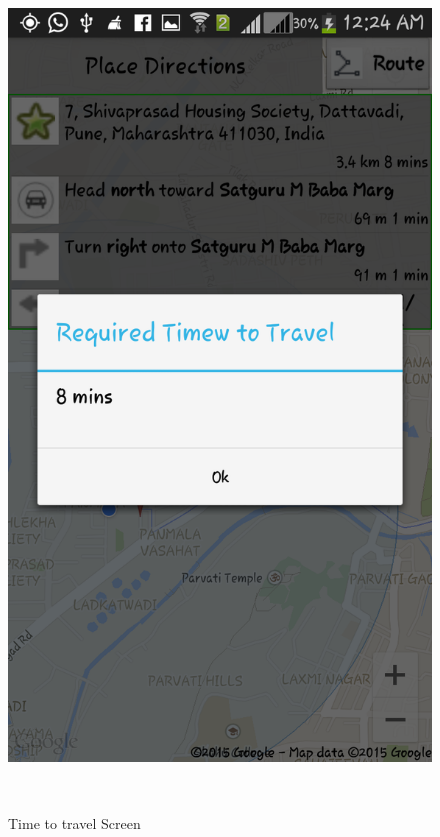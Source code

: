 \documentclass[12pt,a4paper]{article}
\begin{document}
{\begin{figure}[!htb]
\includegraphics[width=12 cm]{time}
\caption{Time to travel Screen}
\\

\end{figure}}
\end{document}
